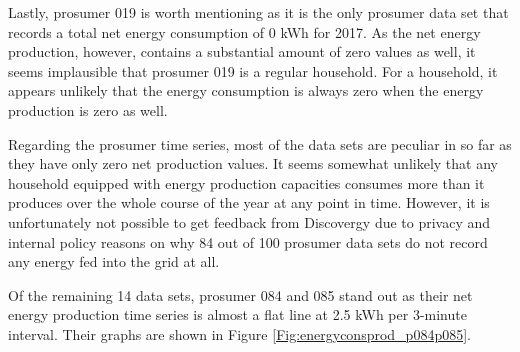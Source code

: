 Lastly, prosumer 019 is worth mentioning as it is the only prosumer data set that records a total net energy consumption of 0 kWh for 2017. As the net energy production, however, contains a substantial amount of zero values as well, it seems implausible that prosumer 019 is a regular household. For a household, it appears unlikely that the energy consumption is always zero when the energy production is zero as well.

Regarding the prosumer time series, most of the data sets are peculiar in so far as they have only zero net production values. It seems somewhat unlikely that any household equipped with energy production capacities consumes more than it produces over the whole course of the year at any point in time. However, it is unfortunately not possible to get feedback from Discovergy due to privacy and internal policy reasons on why 84 out of 100 prosumer data sets do not record any energy fed into the grid at all.

Of the remaining 14 data sets, prosumer 084 and 085 stand out as their net energy production time series is almost a flat line at 2.5 kWh per 3-minute interval. Their graphs are shown in Figure \ref{Fig:energyconsprod_p084p085}.

